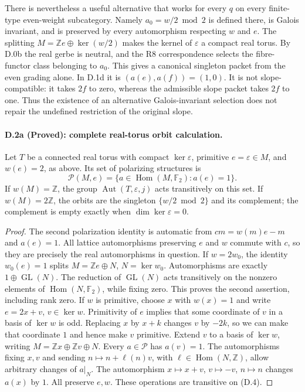There is nevertheless a useful alternative that works for every $q$
on every finite-type even-weight subcategory. Namely
$a_0=w/2\bmod2$ is defined there, is Galois invariant, and is preserved
by every automorphism respecting $w$ and $e$. The splitting
$M=\mathbb Ze\oplus\ker(w/2)$ makes the kernel of $\varepsilon$ a
compact real torus. By D.0b the real gerbe is neutral, and the R8
correspondence selects the fibre-functor class belonging to $a_0$.
This gives a canonical singleton packet from the even grading alone.
In D.1d it is $(a(e),a(f))=(1,0)$. It is not slope-compatible:
it takes $2f$ to zero, whereas the admissible slope packet takes
$2f$ to one. Thus the existence of an alternative Galois-invariant
selection does not repair the undefined restriction of the original
slope.

\paragraph{D.2a (Proved): complete real-torus orbit calculation.}
Let $T$ be a connected real torus with compact $\ker\varepsilon$, primitive
$e=\varepsilon\in M$, and $w(e)=2$, as above. Its set of polarizing
structures is
\[
 \mathcal P(M,e)=\{a\in\operatorname{Hom}(M,\mathbb F _2):a(e)=1\}.
 \tag{D.4}
\]
If $w(M)=\mathbb Z$, the group
$\operatorname{Aut}(T,\varepsilon,j)$ acts transitively on this set. If
$w(M)=2\mathbb Z$, the orbits are the singleton
$\{w/2\bmod2\}$ and its complement; the complement is empty exactly when
$\dim\ker\varepsilon=0$.

\begin{proof}
The second polarization identity is automatic from $cm=w(m)e-m$ and
$a(e)=1$. All lattice automorphisms preserving $e$ and $w$ commute with $c$,
so they are precisely the real automorphisms in question.
If $w=2w_0$, the identity $w_0(e)=1$ splits
$M=\mathbb Ze\oplus N$, $N=\ker w_0$. Automorphisms are exactly
$1\oplus\operatorname{GL}(N)$. The reduction of
$\operatorname{GL}(N)$ acts transitively on the nonzero elements of
$\operatorname{Hom}(N,\mathbb F _2)$, while fixing zero. This proves the
second assertion, including rank zero.
If $w$ is primitive, choose $x$ with $w(x)=1$ and write
$e=2x+v$, $v\in\ker w$. Primitivity of $e$ implies that some coordinate
of $v$ in a basis of $\ker w$ is odd. Replacing $x$ by $x+k$ changes $v$
by $-2k$, so we can make that coordinate $1$ and hence make $v$ primitive.
Extend $v$ to a basis of $\ker w$, writing
$M=\mathbb Zx\oplus\mathbb Zv\oplus N$. Every $a\in\mathcal P$ has
$a(v)=1$. The automorphisms fixing $x,v$ and sending
$n\mapsto n+\ell(n)v$, with $\ell\in\operatorname{Hom}(N,\mathbb Z)$,
allow arbitrary changes of $a|_N$. The automorphism
$x\mapsto x+v$, $v\mapsto-v$, $n\mapsto n$ changes $a(x)$ by $1$.
All preserve $e,w$. These operations are transitive on (D.4).
\end{proof}

